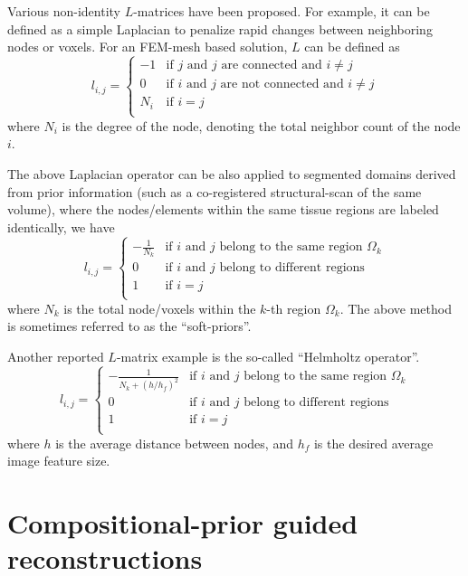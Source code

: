 \documentclass[12pt]{book}               %
\begin{document}
Various non-identity $L$-matrices have been proposed. For example, it can be defined as a simple Laplacian to penalize rapid changes between neighboring nodes or voxels. For an FEM-mesh based solution, $L$ can be defined as 
\begin{equation}
l_{i,j}=\left\{\begin{array}{cl}
-1 & \textrm{if $j$ and $j$ are connected and $i\ne j$}\\
0 &\textrm{if $i$ and $j$ are not connected and $i\ne j$}\\
N_i & \textrm{if $i=j$}\\
\end{array}\right.
\end{equation}
where $N_i$ is the degree of the node, denoting the total neighbor count of the node $i$.

The above Laplacian operator can be also applied to segmented domains derived from prior information (such as a co-registered structural-scan of the same volume), where the nodes/elements within the same tissue regions are labeled identically, we have
\begin{equation}
l_{i,j}=\left\{\begin{array}{cl}
-\frac{1}{N_k} & \textrm{if $i$ and $j$ belong to the same region $\Omega_k$}\\
0 &\textrm{if $i$ and $j$ belong to different regions}\\
1 & \textrm{if $i=j$}\\
\end{array}\right.
\end{equation}
where $N_k$ is the total node/voxels within the $k$-th region $\Omega_k$. The above method is sometimes referred to as the ``soft-priors''.

Another reported $L$-matrix example is the so-called ``Helmholtz operator''. 
\begin{equation}
l_{i,j}=\left\{\begin{array}{cl}
-\frac{1}{N_k +(h/h_f)^2}& \textrm{if $i$ and $j$ belong to the same region $\Omega_k$}\\
0 &\textrm{if $i$ and $j$ belong to different regions}\\
1 & \textrm{if $i=j$}\\
\end{array}\right.
\end{equation}
where $h$ is the average distance between nodes, and $h_f$ is the desired average image feature size.

\section{Compositional-prior guided reconstructions}
\end{document}

